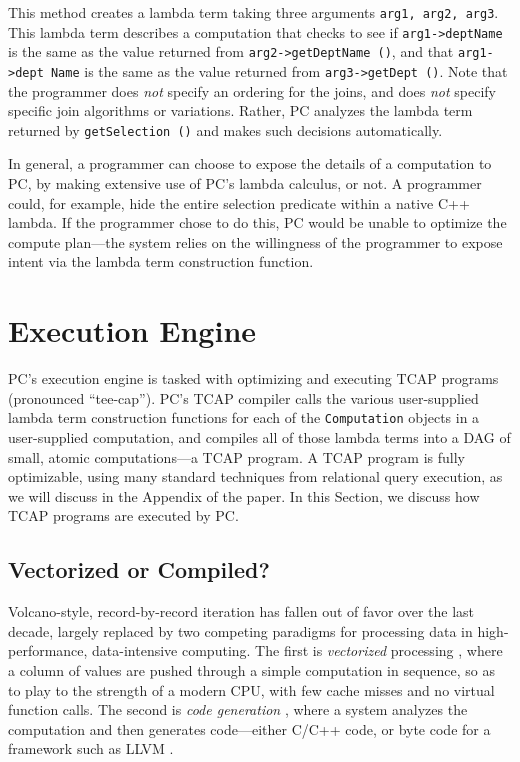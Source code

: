 \noindent
This method creates a lambda term taking three arguments \texttt{arg1, arg2, arg3}.  This lambda term describes a computation that
checks to see if \texttt{arg1->deptName} is the same as the value
returned from \texttt{arg2->getDeptName ()}, and
that \texttt{arg1->dept Name} is the same as the value returned from \texttt{arg3}\-\texttt{->getDept ()}. 
Note that the programmer does \emph{not} specify an ordering for the joins, and does \emph{not} specify specific join algorithms or variations.  Rather, PC
analyzes the lambda term returned by \texttt{getSelection ()} and
makes such decisions automatically.

In general, a programmer can choose to expose the details of a computation to PC, by making extensive use of PC's lambda
calculus, or not.  A programmer could, for example, hide the entire selection predicate within a native C++ lambda.
If the programmer chose to do this, PC would be unable to optimize the compute plan---the system relies on the willingness of the 
programmer to expose intent via the lambda term construction function.

\section{Execution Engine}
\label{sec:engine}

PC's execution engine is tasked with optimizing and executing TCAP programs (pronounced ``tee-cap'').  
PC's TCAP compiler
calls the various user-supplied lambda term construction functions for each of the \texttt{Computation} objects in a
user-supplied computation,
and compiles all of those lambda terms into a DAG of small, atomic computations---a TCAP program.
A TCAP program is fully optimizable, using many standard techniques from relational query execution, as we
will discuss in the Appendix of the paper.
In this Section, we discuss how TCAP programs are executed by PC.

\subsection{Vectorized or Compiled?}
Volcano-style, record-by-record iteration \cite{graefe1990encapsulation} has fallen out of favor over the last decade, largely replaced by
two competing paradigms for processing data
in high-performance, data-intensive computing.  The first is \emph{vectorized} processing \cite{abadi2009column, boncz2005monetdb, zukowski2005monetdb, idreos2012monetdb}, where a column of values are pushed
through a simple computation in sequence, so as to play to the strength of a modern CPU, with few cache misses and no virtual
function calls.  The second is \emph{code generation} \cite{neumann2011efficiently, nagel2014code, bress2017generating, klonatos2014building, ahmad2009dbtoaster}, where a system analyzes the computation
and then generates code---either C/C++ code, or byte code for a framework such as LLVM \cite{lattner2004llvm, lattner2002llvm}.

